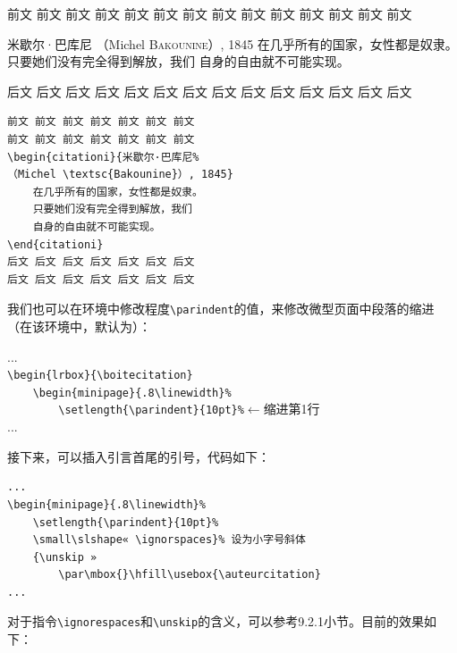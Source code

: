 \begin{codelist}[11.13]{
前文 前文 前文 前文 前文 前文 前文
前文 前文 前文 前文 前文 前文 前文
\begin{citationi}{米歇尔·巴库尼%
    （Michel \textsc{Bakounine}）, 1845}
    在几乎所有的国家，女性都是奴隶。
    只要她们没有完全得到解放，我们
    自身的自由就不可能实现。
\end{citationi}
后文 后文 后文 后文 后文 后文 后文
后文 后文 后文 后文 后文 后文 后文

}\begin{verbatim}
前文 前文 前文 前文 前文 前文 前文
前文 前文 前文 前文 前文 前文 前文
\begin{citationi}{米歇尔·巴库尼%
（Michel \textsc{Bakounine}）, 1845}
    在几乎所有的国家，女性都是奴隶。
    只要她们没有完全得到解放，我们
    自身的自由就不可能实现。
\end{citationi}
后文 后文 后文 后文 后文 后文 后文
后文 后文 后文 后文 后文 后文 后文
\end{verbatim}
\end{codelist}

我们也可以在环境中修改程度\verb|\parindent|的值，来修改微型页面中段落的缩进（在该环境中，默认为\dm{0pt}）：

\begin{dmd}
...\\
\verb|\begin{lrbox}{\boitecitation}|\\
\verb|    \begin{minipage}{.8\linewidth}%|\\
\verb|        \setlength{\parindent}{10pt}%|\quad $\leftarrow$\textsf{缩进第1行}\\
...
\end{dmd}

接下来，可以插入引言首尾的引号，代码如下：

\begin{dmd}
\begin{verbatim}
... 
\begin{minipage}{.8\linewidth}%
    \setlength{\parindent}{10pt}%
    \small\slshape« \ignorspaces}% 设为小字号斜体
    {\unskip »
        \par\mbox{}\hfill\usebox{\auteurcitation}
...
\end{verbatim}
\end{dmd}

对于指令\verb|\ignorespaces|和\verb|\unskip|的含义，可以参考9.2.1小节。目前的效果如下：

